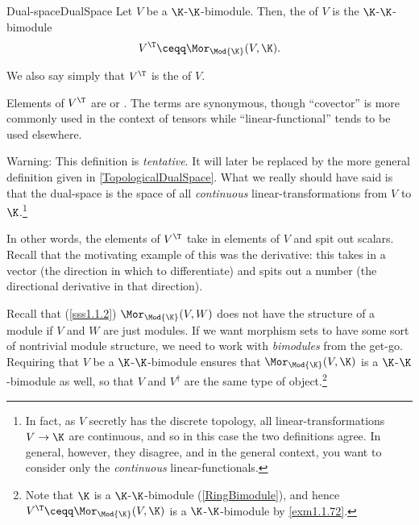 \begin{dfn}{Dual-space}{DualSpace}
	Let $V$ be a $\K$-$\K$-bimodule.  Then, the  of $V$ is the $\K$-$\K$-bimodule
	\begin{equation}
		V^{\T}\ceqq \Mor _{\Mod{\K}}(V,\K ).
	\end{equation}
	\begin{rmk}
		We also say simply that $V^{\T}$ is the  of $V$.
	\end{rmk}
	\begin{rmk}
		Elements of $V^{\T}$ are  or .  The terms are synonymous, though ``covector'' is more commonly used in the context of tensors while ``linear-functional'' tends to be used elsewhere.
	\end{rmk}
	\begin{rmk}
		Warning:  This definition is \emph{tentative}.  It will later be replaced by the more general definition given in \cref{TopologicalDualSpace}.  What we really should have said is that the dual-space is the space of all \emph{continuous} linear-transformations from $V$ to $\K$.\footnote{In fact, as $V$ secretly has the discrete topology, all linear-transformations $V\rightarrow \K$ are continuous, and so in this case the two definitions agree.  In general, however, they disagree, and in the general context, you want to consider only the \emph{continuous} linear-functionals.}
	\end{rmk}
	\begin{rmk}
		In other words, the elements of $V^{\T}$ take in elements of $V$ and spit out scalars.  Recall that the motivating example of this was the derivative:  this takes in a vector (the direction in which to differentiate) and spits out a number (the directional derivative in that direction).
	\end{rmk}
	\begin{rmk}
		Recall that (\cref{sss1.1.2}) $\Mor _{\Mod{\K}}(V,W)$ does not have the structure of a module if $V$ and $W$ are just modules.  If we want morphism sets to have some sort of nontrivial module structure, we need to work with \emph{bimodules} from the get-go.  Requiring that $V$ be a $\K$-$\K$-bimodule ensures that $\Mor _{\Mod{\K}}(V,\K )$ is a $\K$-$\K$-bimodule as well, so that $V$ and $V^{\dagger}$ are the same type of object.\footnote{Note that $\K$ is a $\K$-$\K$-bimodule (\cref{RingBimodule}), and hence $V^{\T}\ceqq \Mor _{\Mod{\K}}(V,\K )$ is a $\K$-$\K$-bimodule by \cref{exm1.1.72}.}
		

\end{rmk}
\end{dfn}
